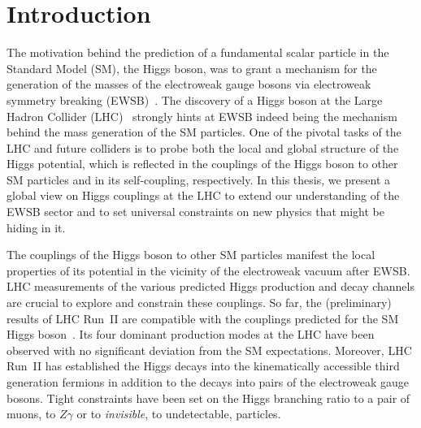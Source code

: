 %
%
%

\chapter{Introduction}\label{chap:introduction}
\enlargethispage{2ex}
\vspace*{-2pt}
The motivation behind the prediction of a fundamental scalar particle in the Standard Model (SM), 
the Higgs boson, was to grant
a mechanism for the generation of the masses of the electroweak gauge bosons via 
electroweak symmetry breaking (EWSB)~\cite{Higgs:1964pj,Higgs:1964ia,Englert:1964et}. 
The discovery of a Higgs boson at the Large Hadron Collider (LHC)~\cite{Aad:2012tfa,Chatrchyan:2012xdj} 
strongly hints at EWSB indeed being the mechanism behind the mass generation of the SM particles.
One of the pivotal tasks of the LHC and future colliders is to probe both the local and global structure of the Higgs 
potential,
which is reflected in the couplings of the Higgs boson to other SM particles and in its
self-coupling, respectively. 
In this thesis, we present a global view on Higgs couplings at the LHC
to extend our understanding of the EWSB sector and
to set universal constraints on new physics that might be hiding in it.
\\ \medskip \vspace*{-2pt}


The couplings of the Higgs boson to other SM particles manifest the 
local properties of its potential in the 
vicinity of the electroweak vacuum after EWSB. 
LHC measurements of the various predicted Higgs production and decay channels are 
crucial to explore and constrain these couplings. 
So far, the (preliminary) results of LHC Run~II are compatible with the 
couplings predicted for the SM Higgs boson~\cite{ATLAS-CONF-2019-005,Sirunyan:2018koj}.
Its four dominant production modes at the LHC 
have been observed with no significant deviation from the SM expectations.
Moreover, LHC Run~II has established the Higgs decays into the 
kinematically accessible third generation fermions in addition to the decays
into pairs of the electroweak gauge bosons.
Tight constraints have been set on the Higgs branching ratio to a pair of muons, to $Z \gamma$
or to \textit{invisible}, \ie to undetectable, particles. 


